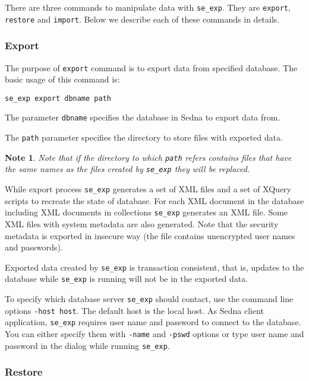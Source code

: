 \documentclass[a4paper,12pt]{article}
\newtheorem{note}{Note}
\begin{document}
There are three commands to manipulate data with \verb!se_exp!. They are \verb!export!,
\verb!restore! and \verb!import!. Below we describe each of these commands in details.




\subsubsection*{Export}
The purpose of \verb!export! command is to export data from specified database. The basic usage 
of this command is:

\begin{verbatim}
se_exp export dbname path
\end{verbatim}

The parameter \verb!dbname! specifies the database in Sedna to export data from. 

The \verb!path! parameter specifies the directory to store files with exported data. 

\begin{note}
Note that if the directory to which \verb!path! refers contains files that have the same names as the files created by \verb!se_exp! they will be replaced. 
\end{note}

While export process \verb!se_exp! generates a set of XML files and a set of XQuery scripts to 
recreate the state of database. For each XML document in the database including XML documents in
collections \verb!se_exp! generates an XML file. Some XML files with system metadata are also
generated. Note that the security metadata is exported in insecure way (the file contains 
unencrypted user names and passwords).

Exported data created by \verb!se_exp! is transaction consistent, that is, updates to the database 
while \verb!se_exp! is running will not be in the exported data. 

To specify which database server \verb!se_exp! should contact, use the command line options 
\verb!-host host!. The default host is the local host. As Sedna client application, \verb!se_exp! 
requires user name and password to connect to the database. You can either specify them with 
\verb!-name! and \verb!-pswd! options or type user name and password in the dialog while 
running \verb!se_exp!.




\subsubsection*{Restore}
\end{document}
